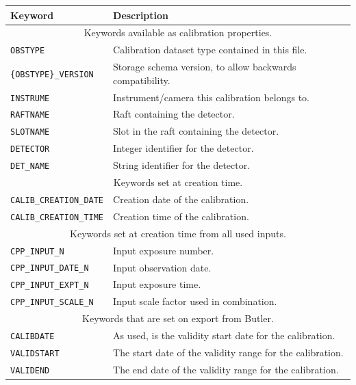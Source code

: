 \documentclass[DM,authoryear,toc]{lsstdoc}
\begin{document}
\begin{tabular}{l l}
  \label{tab:metadata}
  Keyword & Description \\
  \hline
  \multicolumn{2}{c}{Keywords available as calibration properties.} \\
  \verb|OBSTYPE | & Calibration dataset type contained in this file. \\
  \verb|{OBSTYPE}_VERSION| & Storage schema version, to allow backwards compatibility. \\
  \verb|INSTRUME| & Instrument/camera this calibration belongs to. \\
  \verb|RAFTNAME| & Raft containing the detector. \\
  \verb|SLOTNAME| & Slot in the raft containing the detector. \\
  \verb|DETECTOR| & Integer identifier for the detector. \\
  \verb|DET_NAME| & String identifier for the detector. \\
  \hline
  \multicolumn{2}{c}{Keywords set at creation time.} \\
  \verb|CALIB_CREATION_DATE| & Creation date of the calibration. \\
  \verb|CALIB_CREATION_TIME| & Creation time of the calibration. \\
  \hline
  \multicolumn{2}{c}{Keywords set at creation time from all used inputs.} \\
  \verb|CPP_INPUT_N| & Input exposure number. \\
  \verb|CPP_INPUT_DATE_N| & Input observation date. \\
  \verb|CPP_INPUT_EXPT_N| & Input exposure time. \\
  \verb|CPP_INPUT_SCALE_N| & Input scale factor used in combination. \\
  \hline
  \multicolumn{2}{c}{Keywords that are set on export from Butler.} \\
  \verb|CALIBDATE| & As used, is the validity start date for the calibration. \\
  \verb|VALIDSTART| & The start date of the validity range for the calibration. \\
  \verb|VALIDEND| & The end date of the validity range for the calibration. \\
\end{tabular}

\end{document}
